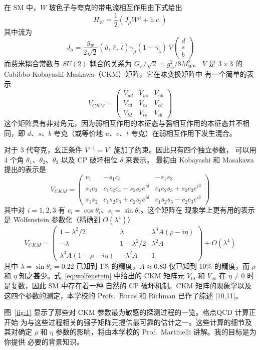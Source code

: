 在 SM 中，$W$ 玻色子与夸克的带电流相互作用由下式给出
\begin{equation}
H_W = \frac{1}{2} \left( J_\mu W^\mu + \text{h.c.} \right)
\label{eq:hw}
\end{equation}
其中流为
\begin{equation}
J_\mu = \frac{g_w}{2\sqrt{2}} \left( \bar{u},\ \bar{c},\ \bar{t} \right)
\gamma_\mu (1 - \gamma_5)\, V
\begin{pmatrix} d \\ s \\ b \end{pmatrix}
\label{eq:jmu}
\end{equation}
而费米耦合常数与 $SU(2)$ 耦合的关系为 $G_F / \sqrt{2} = g_w^2 / 8 M_W^2$。
$V$ 是 $3 \times 3$ 的 Cabibbo-Kobayashi-Maskawa（CKM）矩阵，它在味变换矩阵中
有一个简单的表示
\begin{equation}
V_{CKM} =
\begin{pmatrix}
V_{ud} & V_{us} & V_{ub} \\
V_{cd} & V_{cs} & V_{cb} \\
V_{td} & V_{ts} & V_{tb}
\end{pmatrix}
\label{eq:ckm}
\end{equation}
这个矩阵具有非对角元，因为弱相互作用的本征态与强相互作用的本征态并不相同，即
$d$、$s$、$b$ 夸克（或等价地 $u$、$c$、$t$ 夸克）在弱相互作用下发生混合。

对于 3 代夸克，幺正条件 $V^{-1} = V^\dagger$ 施加了约束。因此只有四个独立参数，
可以用 4 个角 $\theta_1$、$\theta_2$、$\theta_3$ 以及 CP 破坏相位 $\delta$ 来表示。
最初由 Kobayashi 和 Masakawa 提出的表示是
\begin{equation}
V_{CKM} =
\begin{pmatrix}
c_1 & -s_1 c_3 & -s_1 s_3 \\
s_1 c_2 & c_1 c_2 c_3 - s_2 s_3 e^{i\delta} & c_1 c_2 s_3 + s_2 c_3 e^{i\delta} \\
s_1 s_2 & c_1 s_2 c_3 + c_2 s_3 e^{i\delta} & c_1 s_2 s_3 - c_2 c_3 e^{i\delta}
\end{pmatrix}
\label{eq:km}
\end{equation}
其中对 $i = 1, 2, 3$ 有 $c_i = \cos\theta_i$、$s_i = \sin\theta_i$。这个矩阵在
现象学上更有用的表示是 Wolfenstein 参数化（精确到 $O(\lambda^4)$）
\begin{equation}
V_{CKM} =
\begin{pmatrix}
1 - \lambda^2/2 & \lambda & \lambda^3 A (\rho - i\eta) \\
-\lambda & 1 - \lambda^2/2 & \lambda^2 A \\
\lambda^3 A (1 - \rho - i\eta) & -\lambda^2 A & 1
\end{pmatrix}
+ O(\lambda^4)
\label{eq:wolfenstein}
\end{equation}
其中 $\lambda = \sin\theta_c = 0.22$ 已知到 1\% 的精度，$A \approx 0.83$ 仅已知到
10\% 的精度，而 $\rho$ 和 $\eta$ 知之甚少。式~\eqref{eq:wolfenstein} 中给出的
CKM 矩阵元 $V_{td}$ 和 $V_{ub}$ 在 $\eta \neq 0$ 时是复数，因此 SM 中存在着一种
自然的 CP 破坏机制。CKM 矩阵的现象学以及这四个参数的测定，本学校的
Profs.~Buras 和 Richman 已作了综述 [10,11]。

图~\ref{fig:1} 显示了那些对 CKM 参数最为敏感的探测过程的一览。格点QCD 计算正开始
为与这些过程相关的强子矩阵元提供最可靠的估计之一。这些计算的细节及其对确定 $\rho$
和 $\eta$ 参数的影响，将由本学校的 Prof.~Martinelli 讲解。我的目标是为你提供
必要的背景知识。

